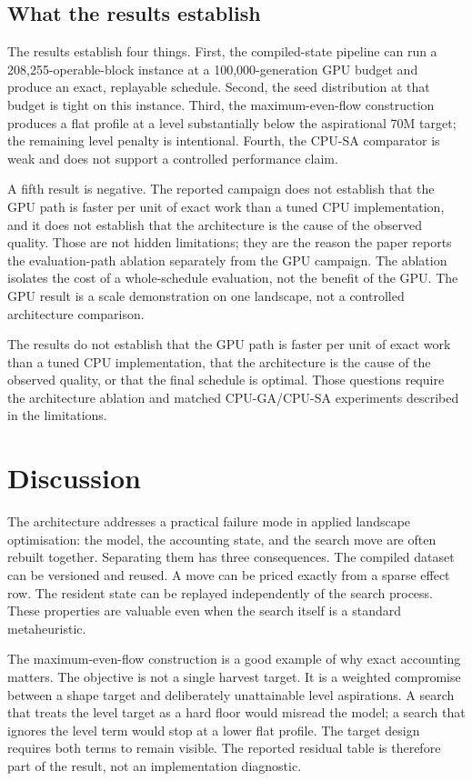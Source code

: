 \documentclass[preprint,11pt]{elsarticle}
\begin{document}
\subsection{What the results establish}

The results establish four things. First, the compiled-state pipeline can run a
208,255-operable-block instance at a 100,000-generation GPU budget and produce an
exact, replayable schedule. Second, the seed distribution at that budget is
tight on this instance. Third, the maximum-even-flow construction produces a
flat profile at a level substantially below the aspirational 70M target; the
remaining level penalty is intentional. Fourth, the CPU-SA comparator is weak
and does not support a controlled performance claim.

A fifth result is negative. The reported campaign does not establish that the
GPU path is faster per unit of exact work than a tuned CPU implementation, and
it does not establish that the architecture is the cause of the observed
quality. Those are not hidden limitations; they are the reason the paper reports
the evaluation-path ablation separately from the GPU campaign. The ablation
isolates the cost of a whole-schedule evaluation, not the benefit of the GPU.
The GPU result is a scale demonstration on one landscape, not a controlled
architecture comparison.

The results do not establish that the GPU path is faster per unit of exact work
than a tuned CPU implementation, that the architecture is the cause of the
observed quality, or that the final schedule is optimal. Those questions require
the architecture ablation and matched CPU-GA/CPU-SA experiments described in
the limitations.

\section{Discussion}\label{discussion}

The architecture addresses a practical failure mode in applied landscape
optimisation: the model, the accounting state, and the search move are often
rebuilt together. Separating them has three consequences. The compiled dataset
can be versioned and reused. A move can be priced exactly from a sparse effect
row. The resident state can be replayed independently of the search process.
These properties are valuable even when the search itself is a standard
metaheuristic.

The maximum-even-flow construction is a good example of why exact accounting
matters. The objective is not a single harvest target. It is a weighted
compromise between a shape target and deliberately unattainable level
aspirations. A search that treats the level target as a hard floor would
misread the model; a search that ignores the level term would stop at a lower
flat profile. The target design requires both terms to remain visible. The
reported residual table is therefore part of the result, not an implementation
diagnostic.
\end{document}
